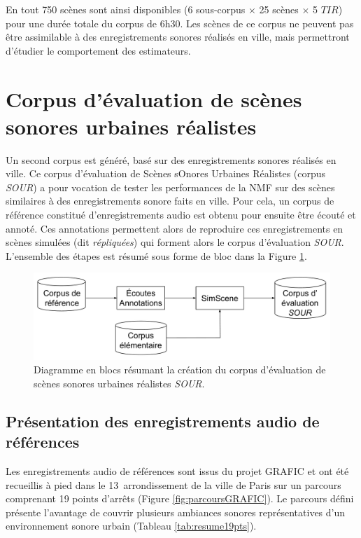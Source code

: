 En tout 750 scènes sont ainsi disponibles (6 sous-corpus $\times$ 25 scènes $\times$ 5 $TIR$) pour une durée totale du corpus de 6h30. Les scènes de ce corpus ne peuvent pas être assimilable à des enregistrements sonores réalisés en ville, mais permettront d'étudier le comportement des estimateurs. 

\section{Corpus d'évaluation de scènes sonores urbaines réalistes}
\label{part:corpus_grafic}

Un second corpus est généré, basé sur des enregistrements sonores réalisés en ville. Ce corpus d'évaluation de Scènes sOnores Urbaines Réalistes (corpus \textit{SOUR}) a pour vocation de tester les performances de la NMF sur des scènes similaires à des enregistrements sonore faits en ville. Pour cela, un corpus de référence constitué d'enregistrements audio est obtenu pour ensuite être écouté et annoté. Ces annotations permettent alors de reproduire ces enregistrements en scènes simulées (dit \textit{répliquées}) qui forment alors le corpus d'évaluation \textit{SOUR}. L'ensemble des étapes est résumé sous forme de bloc dans la Figure \ref{fig:bloc_diagram_annotation}.

\begin{figure}[ht]
\centering
\includegraphics[width=.7\textwidth]{./figures/autres/bloc_diagram_annotation.pdf}
\caption{Diagramme en blocs résumant la création du corpus d'évaluation de scènes sonores urbaines réalistes \textit{SOUR}.}
\label{fig:bloc_diagram_annotation}
\end{figure}

\subsection{Présentation des enregistrements audio de références}

Les enregistrements audio de références sont issus du projet GRAFIC \cite{aumond2017modeling} et ont été recueillis à pied dans le 13\ieme~arrondissement de la ville de Paris sur un parcours comprenant 19 points d'arrêts (Figure \ref{fig:parcoursGRAFIC}). Le parcours défini présente l'avantage de couvrir plusieurs ambiances sonores représentatives d'un environnement sonore urbain (Tableau \ref{tab:resume19pts}).\\

